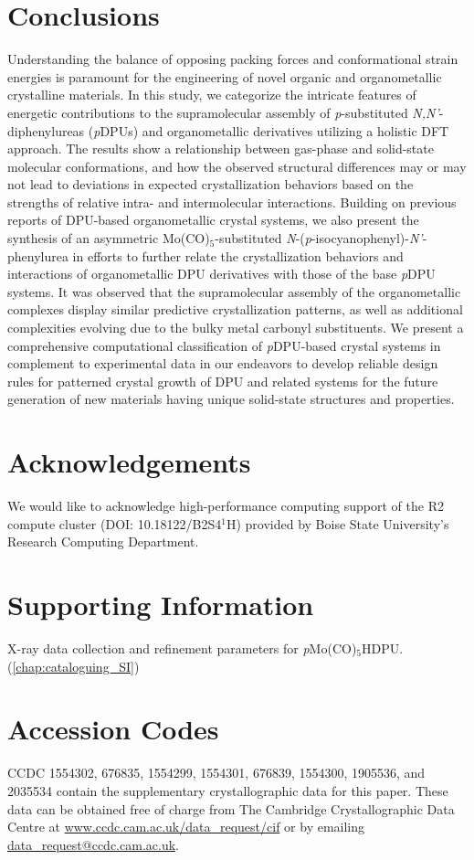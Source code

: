 \section{Conclusions}
Understanding the balance of opposing packing forces and conformational strain energies is paramount for the engineering of novel organic and organometallic crystalline materials. In this study, we categorize the intricate features of energetic contributions to the supramolecular assembly of \textit{p}-substituted \textit{N,N'}-diphenylureas (\textit{p}DPUs) and organometallic derivatives utilizing a holistic DFT approach. The results show a relationship between gas-phase and solid-state molecular conformations, and how the observed structural differences may or may not lead to deviations in expected crystallization behaviors based on the strengths of relative intra- and intermolecular interactions. Building on previous reports of DPU-based organometallic crystal systems, we also present the synthesis of an asymmetric Mo(CO)$_{5}$-substituted \textit{N}-(\textit{p}-isocyanophenyl)-\textit{N'}-phenylurea in efforts to further relate the crystallization behaviors and interactions of organometallic DPU derivatives with those of the base \textit{p}DPU systems. It was observed that the supramolecular assembly of the organometallic complexes display similar predictive crystallization patterns, as well as additional complexities evolving due to the bulky metal carbonyl substituents. We present a comprehensive computational classification of \textit{p}DPU-based crystal systems in complement to experimental data in our endeavors to develop reliable design rules for patterned crystal growth of DPU and related systems for the future generation of new materials having unique solid-state structures and properties.

\section{Acknowledgements}
We would like to acknowledge high-performance computing support of the R2 compute cluster (DOI: 10.18122/B2S4$^{1}$H) provided by Boise State University's Research Computing Department. 

\section{Supporting Information}
X-ray data collection and refinement parameters for \textit{p}Mo(CO)$_{5}$HDPU. (\autoref{chap:cataloguing_SI})

\section{Accession Codes}
CCDC 1554302, 676835, 1554299, 1554301, 676839, 1554300, 1905536, and 2035534 contain the supplementary crystallographic data for this paper. These data can be obtained free of charge from The Cambridge Crystallographic Data Centre at \url{www.ccdc.cam.ac.uk/data_request/cif} or by emailing \href{mailto:data_request@ccdc.cam.ac.uk}{data\_request@ccdc.cam.ac.uk}.
